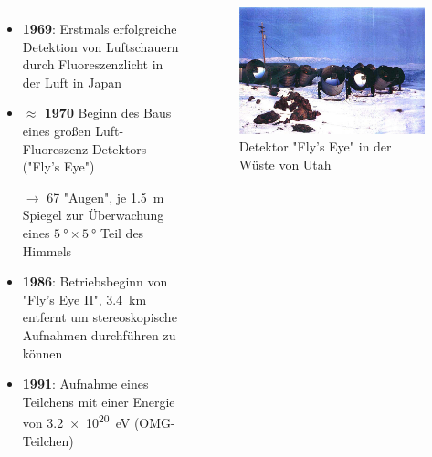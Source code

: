 \documentclass[aspectratio=1610, professionalfonts, 9pt, hyperref={colorlinks=false}]{beamer}
\begin{document}
\begin{frame}{}
  \begin{columns}
      \begin{itemize}
        \setlength\itemsep{0.5em}
        \item \textbf{1969}: Erstmals erfolgreiche Detektion von Luftschauern durch Fluoreszenzlicht in der Luft in Japan
        \item \textbf{$\approx$ 1970} Beginn des Baus eines großen Luft-Fluoreszenz-Detektors ("Fly's Eye")
        \item[$\rightarrow$] 67 "Augen", je \SI{1.5}{\meter} Spiegel zur Überwachung eines $\SI{5}{\degree} \times \SI{5}{\degree}$ Teil des Himmels
        \item \textbf{1986}: Betriebsbeginn von "Fly's Eye II", \SI{3.4}{\kilo\metre} entfernt um stereoskopische Aufnahmen durchführen zu können
        \item \textbf{1991}: Aufnahme eines Teilchens mit einer Energie von \SI{3.2e20}{\electronvolt} (OMG-Teilchen)

      \end{itemize}
        \vspace*{10px}
  
      \begin{figure}
          \centering
          \includegraphics[width=\linewidth]{images/FlysEye.jpg}
          \caption{Detektor "Fly's Eye" in der Wüste von Utah \cite{flyeye}}
      \end{figure}
  \end{columns}
\end{frame}
\end{document}
